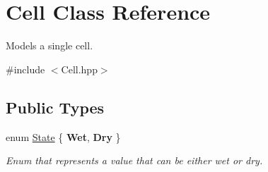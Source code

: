 \hypertarget{class_cell}{}\section{Cell Class Reference}
\label{class_cell}


Models a single cell.  




{\ttfamily \#include $<$Cell.\+hpp$>$}

\subsection*{Public Types}
\begin{DoxyCompactItemize}
\item 
\mbox{\label{class_cell_a21d74a2efcb79c93e5649b06a50b7cf5}} 
enum \hyperlink{class_cell_a21d74a2efcb79c93e5649b06a50b7cf5}{State} \{ {\bfseries Wet}, 
{\bfseries Dry}
 \}
\begin{DoxyCompactList}\small\item\em Enum that represents a value that can be either wet or dry. \end{DoxyCompactList}\end{DoxyCompactItemize}
